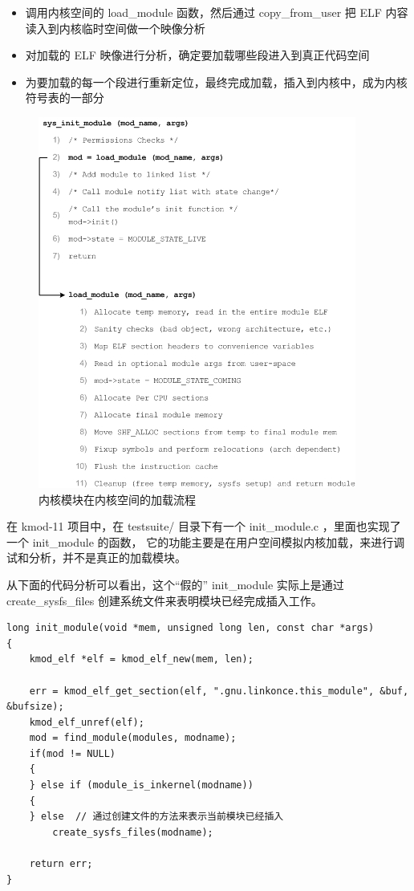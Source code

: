 \documentclass[11pt,a4paper]{article}
\makeatletter
\def\maxwidth{\ifdim\Gin@nat@width>\linewidth\linewidth
\else\Gin@nat@width\fi}
\let\Oldincludegraphics\includegraphics
\renewcommand{\includegraphics}[1]{\Oldincludegraphics[width=\maxwidth]{#1}}
\makeatother
\begin{document}
\begin{itemize}
\item
  调用内核空间的 load\_module 函数，然后通过 copy\_from\_user 把 ELF
  内容读入到内核临时空间做一个映像分析
\item
  对加载的 ELF 映像进行分析，确定要加载哪些段进入到真正代码空间
\item
  为要加载的每一个段进行重新定位，最终完成加载，插入到内核中，成为内核符号表的一部分
\end{itemize}
\begin{figure}[htbp]
\centering
\includegraphics{./figures/sys_init_module.jpg}
\caption{内核模块在内核空间的加载流程}
\end{figure}

在 kmod-11 项目中，在 testsuite/ 目录下有一个 init\_module.c
，里面也实现了一个 init\_module 的函数，
它的功能主要是在用户空间模拟内核加载，来进行调试和分析，并不是真正的加载模块。

从下面的代码分析可以看出，这个``假的'' init\_module 实际上是通过
create\_sysfs\_files 创建系统文件来表明模块已经完成插入工作。

{\begin{shaded}\begin{verbatim}
long init_module(void *mem, unsigned long len, const char *args)
{
    kmod_elf *elf = kmod_elf_new(mem, len);

    err = kmod_elf_get_section(elf, ".gnu.linkonce.this_module", &buf, &bufsize);
    kmod_elf_unref(elf);
    mod = find_module(modules, modname);
    if(mod != NULL)
    { 
    } else if (module_is_inkernel(modname))
    {
    } else  // 通过创建文件的方法来表示当前模块已经插入
        create_sysfs_files(modname);

    return err;
}
\end{verbatim}\end{shaded}}
\end{document}
